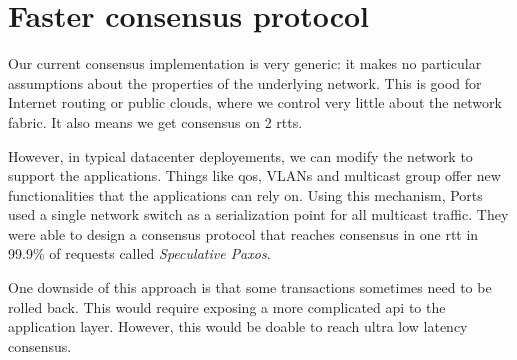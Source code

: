 \section{Faster consensus protocol}

Our current consensus implementation is very generic: it makes no particular assumptions about the properties of the underlying network.
This is good for Internet routing or public clouds, where we control very little about the network fabric.
It also means we get consensus on 2 \glspl{rtt}.

However, in typical datacenter deployements, we can modify the network to support the applications.
Things like \gls{qos}, VLANs and multicast group offer new functionalities that the applications can rely on.
Using this mechanism, Ports \etal used a single network switch as a serialization point for all multicast traffic.
They were able to design a consensus protocol that reaches consensus in one \gls{rtt} in 99.9\% of requests called \emph{Speculative Paxos}\cite{specpaxos}.

One downside of this approach is that some transactions sometimes need to be rolled back.
This would require exposing a more complicated \gls{api} to the application layer.
However, this would be doable to reach ultra low latency consensus.

